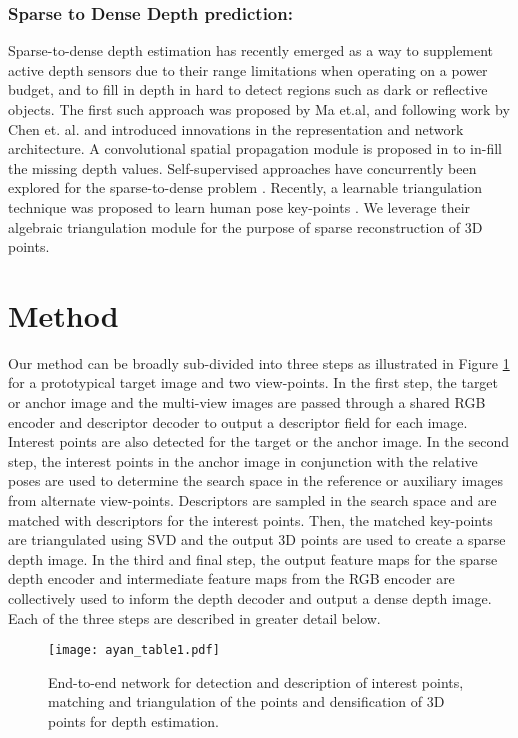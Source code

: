 \documentclass[runningheads]{llncs}
\begin{document}
\subsubsection{Sparse to Dense Depth prediction:} Sparse-to-dense depth estimation has recently emerged as a way to supplement active depth sensors due to their range limitations when operating on a power budget, and to fill in depth in hard to detect regions such as dark or reflective objects. The first such approach was proposed by Ma et.al\cite{Ma2017SparseToDense}, and following work by Chen et. al. \cite{chen2018estimating} and \cite{deep2018funk} introduced innovations in the representation and network architecture. A convolutional spatial propagation module is  proposed in \cite{cheng2018depth} to in-fill the missing depth values. Self-supervised approaches \cite{godard2017unsupervised,garg2016unsupervised} have concurrently been explored for the sparse-to-dense problem \cite{ma2019self}. Recently, a learnable triangulation technique was proposed to learn human pose key-points \cite{iskakov2019learnable}. We leverage their algebraic triangulation module for the purpose of sparse reconstruction of 3D points. 


\section{Method}

Our method can be broadly sub-divided into three steps as illustrated in Figure \ref{fig1} for a prototypical target image and two view-points. In the first step, the target or anchor image and the multi-view images are passed through a shared RGB encoder and descriptor decoder to output a descriptor field for each image. Interest points are also detected for the target or the anchor image. In the second step, the interest points in the anchor image in conjunction with the relative poses are used to determine the search space in the reference or auxiliary images from alternate view-points. Descriptors are sampled in the search space and are matched with descriptors for the interest points. Then, the matched key-points are triangulated using SVD and the output 3D points are used to create a sparse depth image. In the third and final step, the output feature maps for the sparse depth encoder and intermediate feature maps from the RGB encoder are collectively used to inform the depth decoder and output a dense depth image. Each of the three steps are described in greater detail below.  

\begin{figure}[t]
\centering
\texttt{[image: ayan\_table1.pdf]}
\caption{End-to-end network for detection and description of interest points, matching and triangulation of the points and densification of 3D points for depth estimation.} 
\label{fig1}
\end{figure}
\end{document}
